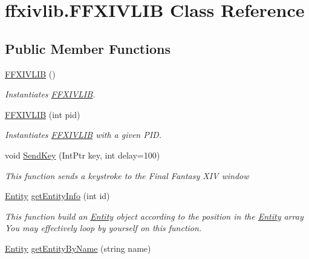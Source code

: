 \hypertarget{classffxivlib_1_1_f_f_x_i_v_l_i_b}{\section{ffxivlib.\-F\-F\-X\-I\-V\-L\-I\-B Class Reference}
\label{classffxivlib_1_1_f_f_x_i_v_l_i_b}
}
\subsection*{Public Member Functions}
\begin{DoxyCompactItemize}
\item 
\hyperlink{classffxivlib_1_1_f_f_x_i_v_l_i_b_aa168e0ea04fa7591285822c023595d32}{F\-F\-X\-I\-V\-L\-I\-B} ()
\begin{DoxyCompactList}\small\item\em Instantiates \hyperlink{classffxivlib_1_1_f_f_x_i_v_l_i_b}{F\-F\-X\-I\-V\-L\-I\-B}. \end{DoxyCompactList}\item 
\hyperlink{classffxivlib_1_1_f_f_x_i_v_l_i_b_aa69576bcd69bdd2d43650d094614dbae}{F\-F\-X\-I\-V\-L\-I\-B} (int pid)
\begin{DoxyCompactList}\small\item\em Instantiates \hyperlink{classffxivlib_1_1_f_f_x_i_v_l_i_b}{F\-F\-X\-I\-V\-L\-I\-B} with a given P\-I\-D. \end{DoxyCompactList}\item 
void \hyperlink{classffxivlib_1_1_f_f_x_i_v_l_i_b_a08db049a37a36d4587c603aded939e17}{Send\-Key} (Int\-Ptr key, int delay=100)
\begin{DoxyCompactList}\small\item\em This function sends a keystroke to the Final Fantasy X\-I\-V window \end{DoxyCompactList}\item 
\hyperlink{classffxivlib_1_1_entity}{Entity} \hyperlink{classffxivlib_1_1_f_f_x_i_v_l_i_b_a4632b29db89772dc247157184e99f684}{get\-Entity\-Info} (int id)
\begin{DoxyCompactList}\small\item\em This function build an \hyperlink{classffxivlib_1_1_entity}{Entity} object according to the position in the \hyperlink{classffxivlib_1_1_entity}{Entity} array You may effectively loop by yourself on this function. \end{DoxyCompactList}\item 
\hyperlink{classffxivlib_1_1_entity}{Entity} \hyperlink{classffxivlib_1_1_f_f_x_i_v_l_i_b_aeb451cfae304d94e04729c7ea5d26da6}{get\-Entity\-By\-Name} (string name)

\end{DoxyCompactItemize}
